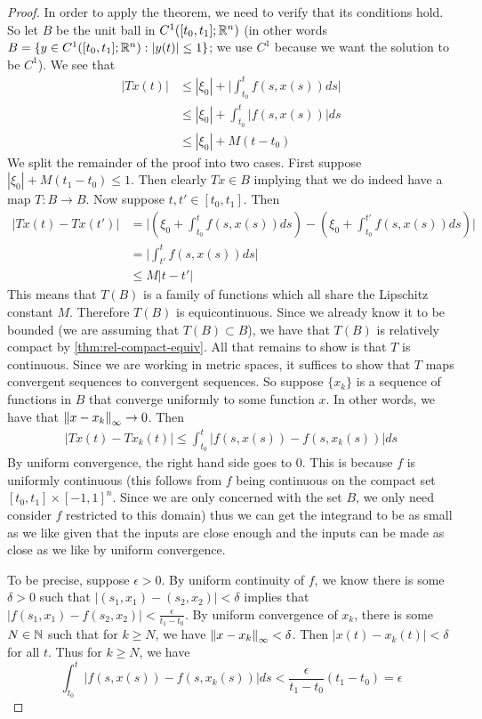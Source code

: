\begin{proof}
In order to apply the theorem, we need to verify that its conditions hold. So let $B$ be the unit ball in $C^1([t_0, t_1]; \mathbb{R}^n)$ (in other words $B = \{y \in C^1([t_0, t_1]; \mathbb{R}^n) : |y(t)| \leq 1\}$; we use $C^1$ because we want the solution to be $C^1$). We see that
\begin{align*}
    |Tx(t)| &\leq |\xi_0| + \bigg| \int_{t_0}^{t} f(s, x(s)) ds \bigg|\\
    &\leq |\xi_0| + \int_{t_0}^{t} |f(s, x(s))| ds\\
    &\leq |\xi_0| + M(t - t_0)
\end{align*}
We split the remainder of the proof into two cases. First suppose $|\xi_0| + M(t_1 - t_0) \leq 1$. Then clearly $Tx \in B$ implying that we do indeed have a map $T: B \to B$. Now suppose $t, t' \in [t_0, t_1]$. Then
\begin{align*}
    |Tx(t) - Tx(t')| &= \bigg| \left(\xi_0 + \int_{t_0}^{t} f(s, x(s)) ds\right) - \left(\xi_0 + \int_{t_0}^{t'} f(s, x(s)) ds \right) \bigg|\\
    &= \bigg| \int_{t'}^{t} f(s, x(s)) ds \bigg|\\
    &\leq M|t - t'|
\end{align*}
This means that $T(B)$ is a family of functions which all share the Lipschitz constant $M$. Therefore $T(B)$ is equicontinuous. Since we already know it to be bounded (we are assuming that $T(B) \subset B$), we have that $T(B)$ is relatively compact by \autoref{thm:rel-compact-equiv}. All that remains to show is that $T$ is continuous. Since we are working in metric spaces, it suffices to show that $T$ maps convergent sequences to convergent sequences. So suppose $\{x_k\}$ is a sequence of functions in $B$ that converge uniformly to some function $x$. In other words, we have that $\left\lVert x - x_k\right\rVert_{\infty} \to 0$. Then
\begin{align*}
    \left| Tx(t) - Tx_k(t) \right| \leq \int_{t_0}^{t} \left| f(s, x(s)) - f(s, x_k(s)) \right| ds
\end{align*}
By uniform convergence, the right hand side goes to 0. This is because $f$ is uniformly continuous (this follows from $f$ being continuous on the compact set $[t_0, t_1] \times [-1, 1]^n$. Since we are only concerned with the set $B$, we only need consider $f$ restricted to this domain) thus we can get the integrand to be as small as we like given that the inputs are close enough and the inputs can be made as close as we like by uniform convergence.

To be precise, suppose $\epsilon > 0$. By uniform continuity of $f$, we know there is some $\delta > 0$ such that $\left| (s_1, x_1) - (s_2, x_2) \right| < \delta$ implies that $\left| f(s_1, x_1) - f(s_2, x_2) \right| < \frac{\epsilon}{t_1 - t_0}$. By uniform convergence of $x_k$, there is some $N \in \mathbb{N}$ such that for $k \geq N$, we have $\left\lVert x - x_k\right\rVert_{\infty} < \delta$. Then $\left| x(t) - x_k(t) \right| < \delta$ for all $t$. Thus for $k \geq N$, we have
$$ \int_{t_0}^{t} \left| f(s, x(s)) - f(s, x_k(s)) \right| ds < \frac{\epsilon}{t_1 - t_0} (t_1 - t_0) = \epsilon $$


\end{proof}
